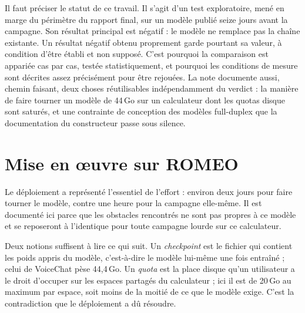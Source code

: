 \documentclass[11pt,a4paper]{article}
\begin{document}
Il faut préciser le statut de ce travail. Il s'agit d'un test exploratoire, mené
en marge du périmètre du rapport final, sur un modèle publié seize jours avant la
campagne. Son résultat principal est négatif : le modèle ne remplace pas la
chaîne existante. Un résultat négatif obtenu proprement garde pourtant sa valeur,
à condition d'être établi et non supposé. C'est pourquoi la comparaison est
appariée cas par cas, testée statistiquement, et pourquoi les conditions de
mesure sont décrites assez précisément pour être rejouées. La note documente
aussi, chemin faisant, deux choses réutilisables indépendamment du verdict : la
manière de faire tourner un modèle de 44\,Go sur un calculateur dont les quotas
disque sont saturés, et une contrainte de conception des modèles full-duplex que
la documentation du constructeur passe sous silence.

\section{Mise en œuvre sur ROMEO}

Le déploiement a représenté l'essentiel de l'effort : environ deux jours pour
faire tourner le modèle, contre une heure pour la campagne elle-même. Il est
documenté ici parce que les obstacles rencontrés ne sont pas propres à ce
modèle et se reposeront à l'identique pour toute campagne lourde sur ce
calculateur.

Deux notions suffisent à lire ce qui suit. Un \emph{checkpoint} est le fichier
qui contient les poids appris du modèle, c'est-à-dire le modèle lui-même une
fois entraîné ; celui de VoiceChat pèse 44,4\,Go. Un \emph{quota} est la place
disque qu'un utilisateur a le droit d'occuper sur les espaces partagés du
calculateur ; ici il est de 20\,Go au maximum par espace, soit moins de la
moitié de ce que le modèle exige. C'est la contradiction que le déploiement a dû
résoudre.
\end{document}
